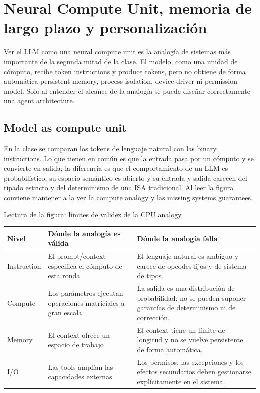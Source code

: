 \section{Neural Compute Unit, memoria de largo plazo y personalización}

Ver el LLM como una neural compute unit es la analogía de sistemas más importante de la segunda mitad de la clase. El modelo, como una unidad de cómputo, recibe token instructions y produce tokens, pero no obtiene de forma automática persistent memory, process isolation, device driver ni permission model. Solo al entender el alcance de la analogía se puede diseñar correctamente una agent architecture.

\subsection{Model as compute unit}

En la clase se comparan los tokens de lenguaje natural con las binary instructions. Lo que tienen en común es que la entrada pasa por un cómputo y se convierte en salida; la diferencia es que el comportamiento de un LLM es probabilístico, su espacio semántico es abierto y su entrada y salida carecen del tipado estricto y del determinismo de una ISA tradicional. Al leer la figura conviene mantener a la vez la compute analogy y las missing systems guarantees.


\begin{knowledgebox}{Lectura de la figura: límites de validez de la CPU analogy}
\begin{tabularx}{\textwidth}{L{0.22\textwidth} L{0.32\textwidth} >{\raggedright\arraybackslash}X}
\toprule
Nivel & Dónde la analogía es válida & Dónde la analogía falla \\
\midrule
Instruction & El prompt/context especifica el cómputo de esta ronda & El lenguaje natural es ambiguo y carece de opcodes fijos y de sistema de tipos. \\
Compute & Los parámetros ejecutan operaciones matriciales a gran escala & La salida es una distribución de probabilidad; no se pueden suponer garantías de determinismo ni de corrección. \\
Memory & El context ofrece un espacio de trabajo & El context tiene un límite de longitud y no se vuelve persistente de forma automática. \\
I/O & Las tools amplían las capacidades externas & Los permisos, las excepciones y los efectos secundarios deben gestionarse explícitamente en el sistema. \\
\bottomrule
\end{tabularx}
\end{knowledgebox}

